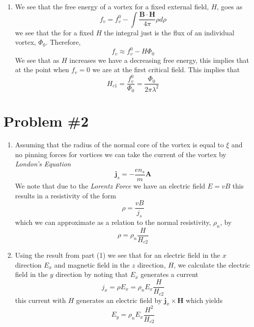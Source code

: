 \documentclass[11pt]{article}
\numberwithin{equation}{section}
\begin{document}
\begin{enumerate}[(1)]
\item We see that the free energy of a vortex for a fixed external field, $H$, goes as
$$f_v = f_v^0 - \int\frac{\mathbf{B}\cdot\mathbf{H}}{4\pi}\rho{d\rho}$$
we see that the for a fixed $H$ the integral just is the flux of an individual vortex, $\Phi_0$. 
Therefore,
$$f_v \approx f_v^0 - H\Phi_0$$
We see that as $H$ increases we have a decreasing free energy, this implies that at the point
when $f_v=0$ we are at the first critical field. This implies that
$$H_{c1} = \frac{f_v^0}{\Phi_0} = \frac{\Phi_0}{2\pi\lambda^2}$$
\end{enumerate}

\section{Problem \#2}
\begin{enumerate}[(1)]
\item Assuming that the radius of the normal core of the vortex is equal to $\xi$ and no 
pinning forces for vortices we can take the current of the vortex by \emph{London's Equation}
$$\mathbf{j}_s = -\frac{en_s}{m}\mathbf{A}$$
We note that due to the \emph{Lorentz Force} we have an electric field $E = vB$ this results
in a resistivity of the form 
$$\rho = \frac{vB}{j_s}$$
which we can approximate as a relation to the normal resistivity, $\rho_n$, by
$$\rho = \rho_n\frac{H}{H_{c2}}$$

\item Using the result from part (1) we see that for an electric field in the $x$ direction
$E_x$ and magnetic field in the $z$ direction, $H$, we calculate the electric field in the
$y$ direction by noting that $E_x$ generates a current 
$$j_x = \rho{E_x} = \rho_nE_x\frac{H}{H_{c2}}$$
this current with $H$ generates an electric field by $\mathbf{j}_x\times\mathbf{H}$ which
yields
$$E_y = \rho_{n}E_x\frac{H^2}{H_{c2}}$$
\end{enumerate}

\pagebreak
\end{document}
